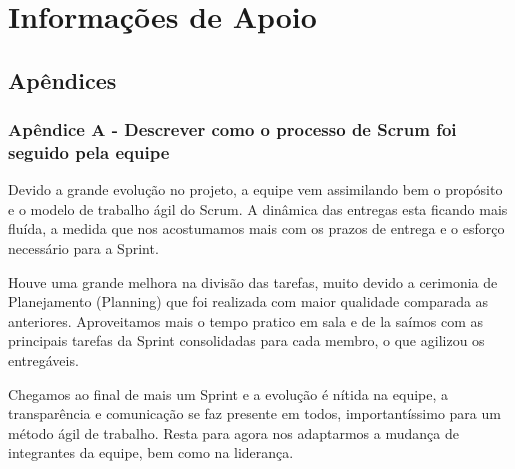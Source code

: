 \documentclass[12pt]{article}
\begin{document}
\section{Informações de Apoio}
\subsection{Apêndices}
\subsubsection{Apêndice A - Descrever como o processo de Scrum foi seguido pela equipe}
Devido a grande evolução no projeto, a equipe vem assimilando bem o propósito e o modelo de trabalho ágil do Scrum. A dinâmica das entregas esta ficando mais fluída, a medida que nos acostumamos mais com os prazos de entrega e o esforço necessário para a Sprint.

Houve uma grande melhora na divisão das tarefas, muito devido a cerimonia de Planejamento (Planning) que foi realizada com maior qualidade comparada as anteriores. Aproveitamos mais o tempo pratico em sala e de la saímos com as principais tarefas da Sprint consolidadas para cada membro, o que agilizou os entregáveis.

Chegamos ao final de mais um Sprint e a evolução é nítida na equipe, a transparência e comunicação se faz presente em todos, importantíssimo para um método ágil de trabalho. Resta para agora nos adaptarmos a mudança de integrantes da equipe, bem como na liderança.


\end{document}
